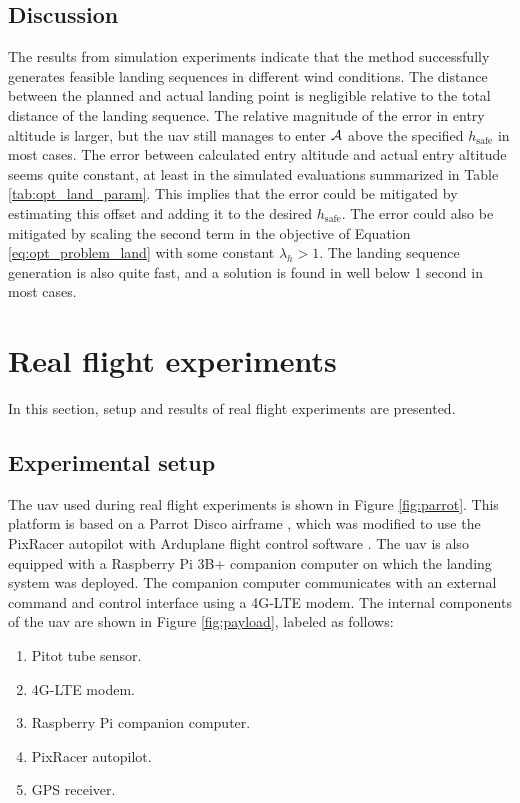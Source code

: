 \subsection{Discussion}
The results from simulation experiments indicate that the method successfully generates feasible landing 
sequences in different wind conditions. The distance between the planned and actual landing point is negligible relative to the total distance of the landing sequence.
The relative magnitude of the error in entry altitude is larger, but the \ac{uav} still manages to enter $\mathcal{A}$ above the specified $h_{\text{safe}}$ in most cases. 
The error between calculated entry altitude and actual entry altitude seems quite constant, at least in the simulated evaluations summarized in Table \ref{tab:opt_land_param}. 
This implies that the error could be mitigated by estimating this offset and adding it to the desired $h_{\text{safe}}$. The error could also be mitigated by scaling the second term in the objective of 
Equation \eqref{eq:opt_problem_land} with some constant $\lambda_h>1$. The landing sequence generation is also quite fast, and a solution is found in well below 1 second in most cases.


\section{Real flight experiments}
In this section, setup and results of real flight experiments are presented.
\subsection{Experimental setup}
The \ac{uav} used during real flight experiments is shown in Figure \ref{fig:parrot}. This platform is based on a Parrot Disco airframe \cite{parrot}, 
which was modified to use the PixRacer autopilot \cite{pixracer} with Arduplane flight control software \cite{arduplane}. The \ac{uav} is also equipped with a 
Raspberry Pi 3B+ companion computer on which the landing system was deployed. The companion computer communicates with an external command and control interface using 
a 4G-LTE modem. The internal components of the \ac{uav} are shown in Figure \ref{fig:payload}, labeled as follows:
\begin{enumerate}
    \item Pitot tube sensor.
    \item 4G-LTE modem.
    \item Raspberry Pi companion computer.
    \item PixRacer autopilot.
    \item GPS receiver.
\end{enumerate}

